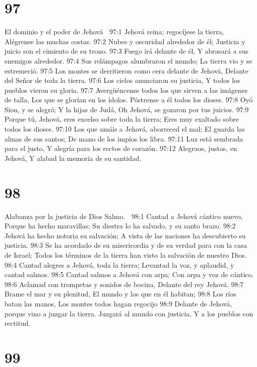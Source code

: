 \chapter{97}

El dominio y el poder de Jehová 

97:1 Jehová reina; regocíjese la tierra, 
Alégrense las muchas costas. 
97:2 Nubes y oscuridad alrededor de él; 
Justicia y juicio son el cimiento de su trono. 
97:3 Fuego irá delante de él, 
Y abrasará a sus enemigos alrededor. 
97:4 Sus relámpagos alumbraron el mundo; 
La tierra vio y se estremeció. 
97:5 Los montes se derritieron como cera delante de Jehová, 
Delante del Señor de toda la tierra. 
97:6 Los cielos anunciaron su justicia, 
Y todos los pueblos vieron su gloria. 
97:7 Avergüéncense todos los que sirven a las imágenes de talla, 
Los que se glorían en los ídolos. 
Póstrense a él todos los dioses. 
97:8 Oyó Sion, y se alegró; 
Y la hijas de Judá, 
Oh Jehová, se gozaron por tus juicios. 
97:9 Porque tú, Jehová, eres excelso sobre toda la tierra; 
Eres muy exaltado sobre todos los dioses. 
97:10 Los que amáis a Jehová, aborreced el mal; 
El guarda las almas de sus santos; 
De mano de los impíos los libra. 
97:11 Luz está sembrada para el justo, 
Y alegría para los rectos de corazón. 
97:12 Alegraos, justos, en Jehová, 
Y alabad la memoria de su santidad. 

\chapter{98}

Alabanza por la justicia de Dios 
Salmo. 

98:1 Cantad a Jehová cántico nuevo, 
Porque ha hecho maravillas; 
Su diestra lo ha salvado, y su santo brazo. 
98:2 Jehová ha hecho notoria su salvación; 
A vista de las naciones ha descubierto su justicia. 
98:3 Se ha acordado de su misericordia y de su verdad para con la casa de Israel; 
Todos los términos de la tierra han visto la salvación de nuestro Dios. 
98:4 Cantad alegres a Jehová, toda la tierra; 
Levantad la voz, y aplaudid, y cantad salmos. 
98:5 Cantad salmos a Jehová con arpa; 
Con arpa y voz de cántico. 
98:6 Aclamad con trompetas y sonidos de bocina, 
Delante del rey Jehová. 
98:7 Brame el mar y su plenitud, 
El mundo y los que en él habitan; 
98:8 Los ríos batan las manos, 
Los montes todos hagan regocijo 
98:9 Delante de Jehová, porque vino a juzgar la tierra. 
Juzgará al mundo con justicia, 
Y a los pueblos con rectitud. 

\chapter{99}

